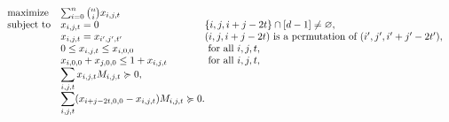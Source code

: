 	\begin{equation}
		\label{indep-sdp2}
		\begin{array}{ll@{}ll}
		\text{maximize}  & \sum_{i=0}^{n} \binom{n}{i} x_{i,j,t}  &\\
		\text{subject to} \displaystyle & x_{i,j,t} = 0 & \{i,j,i+j-2t\} \cap [d-1] \ne \emptyset, \\
		& \displaystyle x_{i,j,t} = x_{i',j',t'} & \text{$(i,j,i+j-2t)$ is a permutation of $(i',j',i'+j'-2t')$}, \\
		& \displaystyle 0 \le x_{i,j,t} \le x_{i,0,0} & \text{ for all $i,j,t$}, \\
		& \displaystyle x_{i,0,0} + x_{j,0,0} \le 1 + x_{i,j,t} & \text{ for all $i,j,t$}, \\
		& \displaystyle \sum_{i,j,t} x_{i,j,t} M_{i,j,t} \pge 0, & \\
		& \displaystyle \sum_{i,j,t} (x_{i+j-2t,0,0} - x_{i,j,t}) M_{i,j,t} \pge 0. &
		\end{array}
	\end{equation}